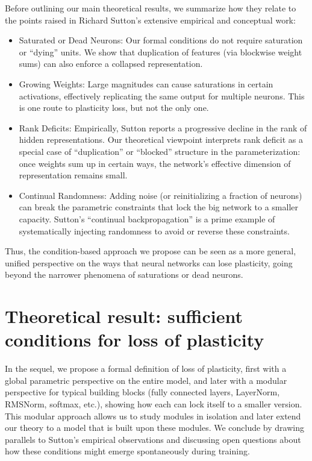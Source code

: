 \documentclass[11pt]{article}
\begin{document}
Before outlining our main theoretical results, we summarize how they relate to the points raised in Richard Sutton's extensive empirical and conceptual work:
\begin{itemize}
    \item Saturated or Dead Neurons: Our formal conditions do not require saturation or ``dying'' units. We show that duplication of features (via blockwise weight sums) can also enforce a collapsed representation.
    \item Growing Weights: Large magnitudes can cause saturations in certain activations, effectively replicating the same output for multiple neurons. This is one route to plasticity loss, but not the only one.
    \item Rank Deficits: Empirically, Sutton reports a progressive decline in the rank of hidden representations. Our theoretical viewpoint interprets rank deficit as a special case of ``duplication'' or ``blocked'' structure in the parameterization: once weights sum up in certain ways, the network's effective dimension of representation remains small.
    \item Continual Randomness: Adding noise (or reinitializing a fraction of neurons) can break the parametric constraints that lock the big network to a smaller capacity. Sutton's ``continual backpropagation'' is a prime example of systematically injecting randomness to avoid or reverse these constraints.
\end{itemize}
Thus, the condition-based approach we propose can be seen as a more general, unified perspective on the ways that neural networks can lose plasticity, going beyond the narrower phenomena of saturations or dead neurons.

\section{Theoretical result: sufficient conditions for loss of plasticity}

In the sequel, we propose a formal definition of loss of plasticity, first with a global parametric perspective on the entire model, and later with a modular perspective for typical building blocks (fully connected layers, LayerNorm, RMSNorm, softmax, etc.), showing how each can lock itself to a smaller version. This modular approach allows us to study modules in isolation and later extend our theory to a model that is built upon these modules. We conclude by drawing parallels to Sutton's empirical observations and discussing open questions about how these conditions might emerge spontaneously during training.
\end{document}
